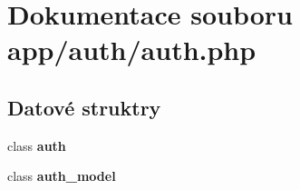 \section{Dokumentace souboru app/auth/auth.php}
\label{db/d90/auth_8php}
\subsection*{Datové struktry}
\begin{DoxyCompactItemize}
\item 
class {\bf auth}
\item 
class {\bf auth\_\-model}
\end{DoxyCompactItemize}
